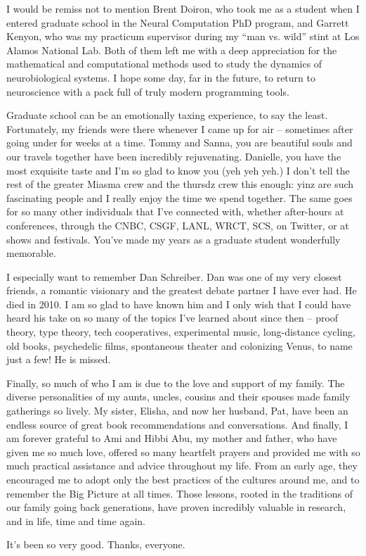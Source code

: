 \documentclass[12pt]{cmuthesis}
\begin{document}
\begin{acknowledgments}
I would be remiss not to mention Brent Doiron, who took me as a student when I entered graduate school in the Neural Computation PhD program, and Garrett Kenyon,  who was my practicum supervisor during my ``man vs. wild'' stint at Los Alamos National Lab. Both of them left me with a deep appreciation for the  mathematical and computational methods used to study the dynamics of neurobiological systems. I hope some day, far in the future, to return to neuroscience with a pack full of truly modern programming tools.

Graduate school can be an emotionally taxing experience, to say the least. Fortunately, my friends were there whenever I came up for air -- sometimes after going under for weeks at a time. Tommy and Sanna, you are beautiful souls and our travels together have been incredibly rejuvenating. Danielle, you have the most exquisite taste and I'm so glad to know you (yeh yeh yeh.) I don't tell the rest of the greater Miasma crew and the thursdz crew this enough: yinz are such fascinating people and I really enjoy the time we spend together. The same goes for so many other individuals that I've connected with, whether after-hours at conferences, through the CNBC, CSGF, LANL, WRCT, SCS, on Twitter, or at shows and festivals. You've made my years as a graduate student wonderfully memorable.

I especially want to remember Dan Schreiber. Dan was one of my very closest friends, a romantic visionary and the greatest debate partner I have ever had. He died in 2010. I am so glad to have known him and I only wish that I could have heard his take on so many of the topics I've learned about since then -- proof theory, type theory, tech cooperatives, experimental music, long-distance cycling, old books, psychedelic films,  spontaneous theater and colonizing Venus, to name just a few! He is missed.

Finally, so much of who I am is due to the love and support of my family. The diverse personalities of my aunts, uncles, cousins and their spouses made family gatherings so lively. My sister, Elisha, and now her husband, Pat, have been an endless source of great book recommendations and conversations. And finally, I am forever grateful to Ami and Hibbi Abu, my mother and father, who have given me so much love, offered so many heartfelt prayers and provided me with so much practical assistance and advice throughout my life. From an early age, they encouraged me to adopt only the best practices of the cultures around me, and to remember the Big Picture at all times. Those lessons, rooted in the traditions of our family going back generations, have proven incredibly valuable in research, and in life, time and time again.

It's been so very good. Thanks, everyone. 

\end{acknowledgments}
\end{document}
